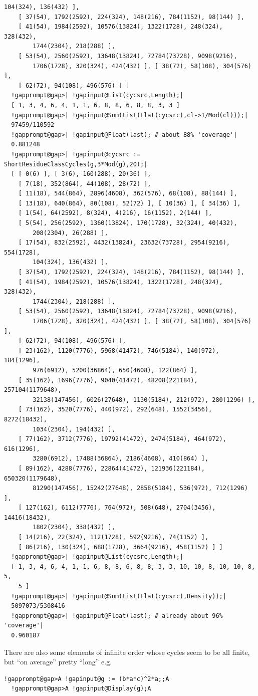 \documentclass[a4paper,11pt]{report}
\begin{document}
{{\begin{Verbatim}[commandchars=!@|,fontsize=\small,frame=single,label=Example]
        104(324), 136(432) ], 
    [ 37(54), 1792(2592), 224(324), 148(216), 784(1152), 98(144) ], 
    [ 41(54), 1984(2592), 10576(13824), 1322(1728), 248(324), 328(432), 
        1744(2304), 218(288) ], 
    [ 53(54), 2560(2592), 13648(13824), 72784(73728), 9098(9216), 
        1706(1728), 320(324), 424(432) ], [ 38(72), 58(108), 304(576) ], 
    [ 62(72), 94(108), 496(576) ] ]
  !gapprompt@gap>| !gapinput@List(cycsrc,Length);|
  [ 1, 3, 4, 6, 4, 1, 1, 6, 8, 8, 6, 8, 8, 3, 3 ]
  !gapprompt@gap>| !gapinput@Sum(List(Flat(cycsrc),cl->1/Mod(cl)));|
  97459/110592
  !gapprompt@gap>| !gapinput@Float(last); # about 88% 'coverage'|
  0.881248
  !gapprompt@gap>| !gapinput@cycsrc := ShortResidueClassCycles(g,3*Mod(g),20);|
  [ [ 0(6) ], [ 3(6), 160(288), 20(36) ], 
    [ 7(18), 352(864), 44(108), 28(72) ], 
    [ 11(18), 544(864), 2896(4608), 362(576), 68(108), 88(144) ], 
    [ 13(18), 640(864), 80(108), 52(72) ], [ 10(36) ], [ 34(36) ], 
    [ 1(54), 64(2592), 8(324), 4(216), 16(1152), 2(144) ], 
    [ 5(54), 256(2592), 1360(13824), 170(1728), 32(324), 40(432), 
        208(2304), 26(288) ], 
    [ 17(54), 832(2592), 4432(13824), 23632(73728), 2954(9216), 554(1728), 
        104(324), 136(432) ], 
    [ 37(54), 1792(2592), 224(324), 148(216), 784(1152), 98(144) ], 
    [ 41(54), 1984(2592), 10576(13824), 1322(1728), 248(324), 328(432), 
        1744(2304), 218(288) ], 
    [ 53(54), 2560(2592), 13648(13824), 72784(73728), 9098(9216), 
        1706(1728), 320(324), 424(432) ], [ 38(72), 58(108), 304(576) ], 
    [ 62(72), 94(108), 496(576) ], 
    [ 23(162), 1120(7776), 5968(41472), 746(5184), 140(972), 184(1296), 
        976(6912), 5200(36864), 650(4608), 122(864) ], 
    [ 35(162), 1696(7776), 9040(41472), 48208(221184), 257104(1179648), 
        32138(147456), 6026(27648), 1130(5184), 212(972), 280(1296) ], 
    [ 73(162), 3520(7776), 440(972), 292(648), 1552(3456), 8272(18432), 
        1034(2304), 194(432) ], 
    [ 77(162), 3712(7776), 19792(41472), 2474(5184), 464(972), 616(1296), 
        3280(6912), 17488(36864), 2186(4608), 410(864) ], 
    [ 89(162), 4288(7776), 22864(41472), 121936(221184), 650320(1179648), 
        81290(147456), 15242(27648), 2858(5184), 536(972), 712(1296) ], 
    [ 127(162), 6112(7776), 764(972), 508(648), 2704(3456), 14416(18432), 
        1802(2304), 338(432) ], 
    [ 14(216), 22(324), 112(1728), 592(9216), 74(1152) ], 
    [ 86(216), 130(324), 688(1728), 3664(9216), 458(1152) ] ]
  !gapprompt@gap>| !gapinput@List(cycsrc,Length);|
  [ 1, 3, 4, 6, 4, 1, 1, 6, 8, 8, 6, 8, 8, 3, 3, 10, 10, 8, 10, 10, 8, 5, 
    5 ]
  !gapprompt@gap>| !gapinput@Sum(List(Flat(cycsrc),Density));|
  5097073/5308416
  !gapprompt@gap>| !gapinput@Float(last); # already about 96% 'coverage'|
  0.960187
\end{Verbatim}
 There are also some elements of infinite order whose cycles seem to be all
finite, but ``on average'' pretty ``long'' \texttt{}\texttt{} e.g. 
\begin{Verbatim}[commandchars=!@A,fontsize=\small,frame=single,label=Example]
  !gapprompt@gap>A !gapinput@g := (b*a*c)^2*a;;A
  !gapprompt@gap>A !gapinput@Display(g);A
  

\end{Verbatim}}}
\end{document}
